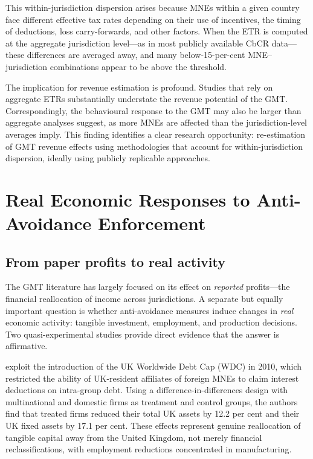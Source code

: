 \documentclass[12pt,a4paper]{article}
\begin{document}
This within-jurisdiction dispersion arises because MNEs within a given country face different effective tax rates depending on their use of incentives, the timing of deductions, loss carry-forwards, and other factors.
When the ETR is computed at the aggregate jurisdiction level---as in most publicly available CbCR data---these differences are averaged away, and many below-15-per-cent MNE--jurisdiction combinations appear to be above the threshold.

The implication for revenue estimation is profound.
Studies that rely on aggregate ETRs substantially understate the revenue potential of the GMT.
Correspondingly, the behavioural response to the GMT may also be larger than aggregate analyses suggest, as more MNEs are affected than the jurisdiction-level averages imply.
This finding identifies a clear research opportunity: re-estimation of GMT revenue effects using methodologies that account for within-jurisdiction dispersion, ideally using publicly replicable approaches.


\section{Real Economic Responses to Anti-Avoidance Enforcement}\label{sec:realresponses}

\subsection{From paper profits to real activity}

The GMT literature has largely focused on its effect on \emph{reported} profits---the financial reallocation of income across jurisdictions.
A separate but equally important question is whether anti-avoidance measures induce changes in \emph{real} economic activity: tangible investment, employment, and production decisions.
Two quasi-experimental studies provide direct evidence that the answer is affirmative.

\textcite{bilicka2022} exploit the introduction of the UK Worldwide Debt Cap (WDC) in 2010, which restricted the ability of UK-resident affiliates of foreign MNEs to claim interest deductions on intra-group debt.
Using a difference-in-differences design with multinational and domestic firms as treatment and control groups, the authors find that treated firms reduced their total UK assets by 12.2 per cent and their UK fixed assets by 17.1 per cent.
These effects represent genuine reallocation of tangible capital away from the United Kingdom, not merely financial reclassifications, with employment reductions concentrated in manufacturing.
\end{document}
